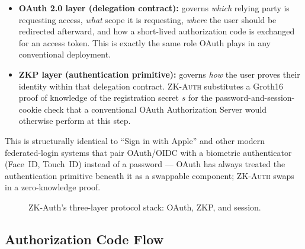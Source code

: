 \documentclass[12pt,a4paper,oneside]{report}
\begin{document}
\begin{itemize}
  \item \textbf{OAuth 2.0 layer (delegation contract):} governs
        \textit{which} relying party is requesting access, \textit{what}
        scope it is requesting, \textit{where} the user should be
        redirected afterward, and how a short-lived authorization code
        is exchanged for an access token. This is exactly the same role
        OAuth plays in any conventional deployment.
  \item \textbf{ZKP layer (authentication primitive):} governs
        \textit{how} the user proves their identity within that
        delegation contract. \textsc{ZK-Auth} substitutes a Groth16
        proof of knowledge of the registration secret $s$ for the
        password-and-session-cookie check that a conventional OAuth
        Authorization Server would otherwise perform at this step.
\end{itemize}

This is structurally identical to ``Sign in with Apple'' and other
modern federated-login systems that pair OAuth/OIDC with a
biometric authenticator (Face~ID, Touch~ID) instead of a password ---
OAuth has always treated the authentication primitive beneath it as a
swappable component; \textsc{ZK-Auth} swaps in a zero-knowledge proof.

\begin{figure}[htbp]
\centering
{}
\caption{ZK-Auth's three-layer protocol stack: OAuth, ZKP, and session.}
\label{fig:oauth_zkp_layers}
\end{figure}

\subsection{Authorization Code Flow}
\end{document}
